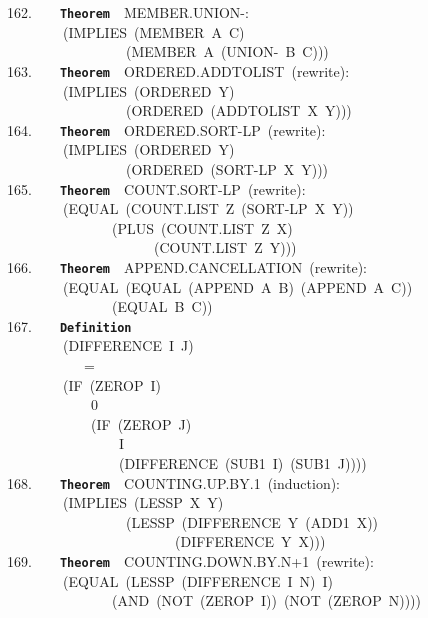 \documentclass[11pt]{book}
\newenvironment{pubasis}{\begin{flushleft}\ttfamily\small}{\normalsize\rmfamily\end{flushleft}}
\newcommand{\axiomordefinition}[1]{\vspace{6pt}\texttt{\textbf{#1}}}
\begin{document}
\begin{pubasis}
162.~~~~\axiomordefinition{Theorem}~~MEMBER.UNION-:\\
~~~~~~~~(IMPLIES~(MEMBER~A~C)\\
~~~~~~~~~~~~~~~~~(MEMBER~A~(UNION-~B~C)))\\

163.~~~~\axiomordefinition{Theorem}~~ORDERED.ADD\-TO\-LIST~(rewrite):\\
~~~~~~~~(IMPLIES~(ORDERED~Y)\\
~~~~~~~~~~~~~~~~~(ORDERED~(ADDTOLIST~X~Y)))\\

164.~~~~\axiomordefinition{Theorem}~~ORDERED.SORT-LP~(rewrite):\\
~~~~~~~~(IMPLIES~(ORDERED~Y)\\
~~~~~~~~~~~~~~~~~(ORDERED~(SORT-LP~X~Y)))\\

165.~~~~\axiomordefinition{Theorem}~~COUNT.SORT-LP~(rewrite):\\
~~~~~~~~(EQUAL~(COUNT.LIST~Z~(SORT-LP~X~Y))\\
~~~~~~~~~~~~~~~(PLUS~(COUNT.LIST~Z~X)\\
~~~~~~~~~~~~~~~~~~~~~(COUNT.LIST~Z~Y)))\\

166.~~~~\axiomordefinition{Theorem}~~APPEND.CAN\-CELLATION~(rewrite):\\
~~~~~~~~(EQUAL~(EQUAL~(APPEND~A~B)~(APPEND~A~C))\\
~~~~~~~~~~~~~~~(EQUAL~B~C))\\

167.~~~~\axiomordefinition{Definition}\\
~~~~~~~~(DIFFERENCE~I~J)\\
~~~~~~~~~~~=\\
~~~~~~~~(IF~(ZEROP~I)\\
~~~~~~~~~~~~0\\
~~~~~~~~~~~~(IF~(ZEROP~J)\\
~~~~~~~~~~~~~~~~I\\
~~~~~~~~~~~~~~~~(DIFFERENCE~(SUB1~I)~(SUB1~J))))\\

168.~~~~\axiomordefinition{Theorem}~~COUNTING.UP.BY.1~(induction):\\
~~~~~~~~(IMPLIES~(LESSP~X~Y)\\
~~~~~~~~~~~~~~~~~(LESSP~(DIFFERENCE~Y~(ADD1~X))\\
~~~~~~~~~~~~~~~~~~~~~~~~(DIFFERENCE~Y~X)))\\

169.~~~~\axiomordefinition{Theorem}~~COUNTING.DOWN.BY.N+1~(rewrite):\\
~~~~~~~~(EQUAL~(LESSP~(DIFFERENCE~I~N)~I)\\
~~~~~~~~~~~~~~~(AND~(NOT~(ZEROP~I))~(NOT~(ZEROP~N))))\\


\end{pubasis}
\end{document}
